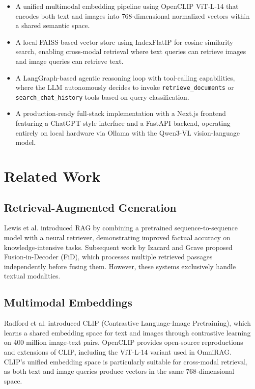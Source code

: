 \documentclass[conference]{IEEEtran}
\begin{document}
\begin{itemize}
    \item A unified multimodal embedding pipeline using OpenCLIP ViT-L-14 that encodes both text and images into 768-dimensional normalized vectors within a shared semantic space.
    \item A local FAISS-based vector store using IndexFlatIP for cosine similarity search, enabling cross-modal retrieval where text queries can retrieve images and image queries can retrieve text.
    \item A LangGraph-based agentic reasoning loop with tool-calling capabilities, where the LLM autonomously decides to invoke \texttt{retrieve\_documents} or \texttt{search\_chat\_history} tools based on query classification.
    \item A production-ready full-stack implementation with a Next.js frontend featuring a ChatGPT-style interface and a FastAPI backend, operating entirely on local hardware via Ollama with the Qwen3-VL vision-language model.
\end{itemize}

\section{Related Work}

\subsection{Retrieval-Augmented Generation}
Lewis et al. \cite{lewis2020rag} introduced RAG by combining a pretrained sequence-to-sequence model with a neural retriever, demonstrating improved factual accuracy on knowledge-intensive tasks. Subsequent work by Izacard and Grave \cite{izacard2021fid} proposed Fusion-in-Decoder (FiD), which processes multiple retrieved passages independently before fusing them. However, these systems exclusively handle textual modalities.

\subsection{Multimodal Embeddings}
Radford et al. \cite{radford2021clip} introduced CLIP (Contrastive Language-Image Pretraining), which learns a shared embedding space for text and images through contrastive learning on 400 million image-text pairs. OpenCLIP \cite{ilharco2021openclip} provides open-source reproductions and extensions of CLIP, including the ViT-L-14 variant used in OmniRAG. CLIP's unified embedding space is particularly suitable for cross-modal retrieval, as both text and image queries produce vectors in the same 768-dimensional space.
\end{document}
